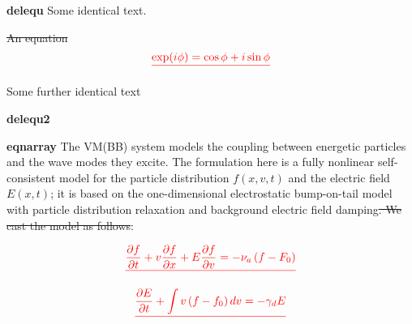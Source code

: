 \documentclass{article}
\providecommand{\DIFdel}[1]{{\protect\color{red}\sout{#1}}}                      %
\providecommand{\DIFaddbegin}{} %
\providecommand{\DIFaddend}{} %
\providecommand{\DIFdelbegin}{} %
\providecommand{\DIFdelend}{} %
\begin{document}
\textbf{delequ}
Some identical text.

\DIFdelbegin \DIFdel{An equation
}\begin{displaymath}\DIFdel{
\exp(i\phi)=\cos \phi + i \sin \phi
}\end{displaymath}

\DIFdelend Some further identical text



\textbf{delequ2}
\DIFdelbegin %
\DIFdelend \DIFaddbegin 
\DIFaddend 

\textbf{eqnarray}
The VM(BB) system models the coupling between energetic particles and the wave modes they excite.
The formulation here is a fully nonlinear self-consistent model for the particle distribution $f(x,v,t)$ and the electric field $E(x,t)$; it is based on the one-dimensional electrostatic bump-on-tail model with particle distribution relaxation and background electric field damping\DIFdelbegin \DIFdel{. We cast the model as follows}\DIFdelend :

\DIFdelbegin \begin{displaymath}\DIFdel{
\label{MVE}
	\frac{\partial f}{\partial t} + v \frac{\partial f}{\partial x} + E \frac{\partial f}{\partial v} =
		- \nu_a \left( f - F_0 \right)
}\end{displaymath}

\begin{displaymath}\DIFdel{
\label{MDCE}
	\frac{\partial E}{\partial t} + \int v \left( f - f_0 \right) dv = - \gamma_d E
}\end{displaymath}
\end{document}
